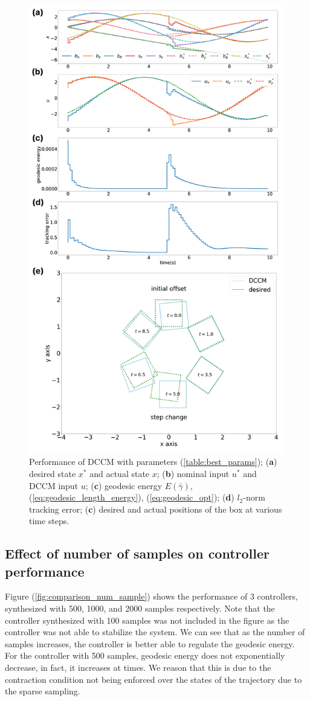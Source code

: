 \documentclass[journal]{IEEEtran}
\begin{document}
\begin{figure}[h]
	\centering\includegraphics[width = 0.47 \textwidth]
	{figures/result_lbw10_2000samples.png}
    \caption{Performance of DCCM with parameters (\ref{table:best_params}); (\textbf{a}) desired state $x^*$ and actual state $x$; (\textbf{b}) nominal input $u^*$ and DCCM input $u$; (\textbf{c}) geodesic energy $E(\bar{\gamma})$, (\ref{eq:geodesic_length_energy}), (\ref{eq:geodesic_opt}); (\textbf{d}) $l_2$-norm tracking error; (\textbf{c}) desired and actual positions of the box at various time steps.}
	\label{fig:result_2000}
\end{figure}

\subsection{Effect of number of samples on controller performance}
Figure (\ref{fig:comparison_num_sample}) shows the performance of 3 controllers, synthesized with 500, 1000, and 2000 samples respectively. Note that the controller synthesized with 100 samples was not included in the figure as the controller was not able to stabilize the system. We can see that as the number of samples increases, the controller is better able to regulate the geodesic energy. For the controller with 500 samples, geodesic energy does not exponentially decrease, in fact, it increases at times. We reason that this is due to the contraction condition not being enforced over the states of the trajectory due to the sparse sampling.
\end{document}
